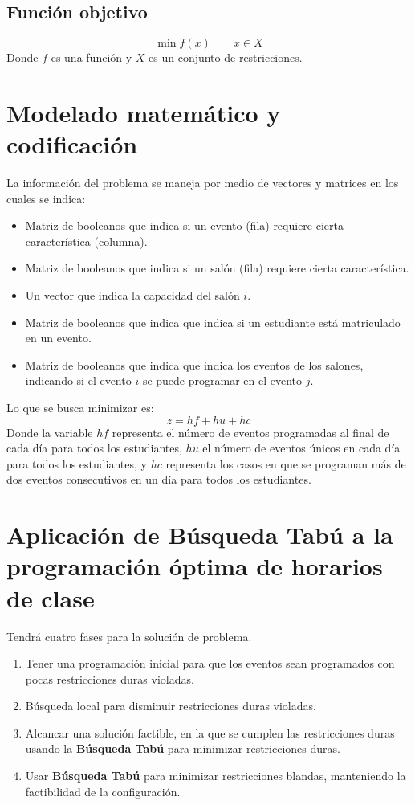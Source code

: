 \documentclass[12pt,letterpaper]{article}
\begin{document}
\subsection{Función objetivo}
\[
    \min f(x) \qquad x \in X
\]
Donde $f$ es una función y $X$ es un conjunto de restricciones.

\section{Modelado matemático y codificación}
La información del problema se maneja por medio de vectores y matrices en los cuales se indica:
\begin{itemize}
    \item Matriz de booleanos que indica si un evento (fila) requiere cierta característica (columna).
    \item Matriz de booleanos que indica si un salón (fila) requiere cierta característica.
    \item Un vector que indica la capacidad del salón $i$.
    \item Matriz de booleanos que indica que indica si un estudiante está matriculado en un evento.
    \item Matriz de booleanos que indica que indica los eventos de los salones, indicando si el evento
    $i$ se puede programar en el evento $j$.
\end{itemize}

Lo que se busca minimizar es:
$$z = hf + hu + hc$$
Donde la variable $hf$ representa el número de eventos programadas al final de cada día para todos
los estudiantes, $hu$ el número de eventos únicos en cada día para todos los estudiantes, y
$hc$ representa los casos en que se programan más de dos eventos consecutivos en un día para todos los estudiantes.

\section{Aplicación de Búsqueda Tabú a la programación óptima de horarios de clase}
Tendrá cuatro fases para la solución de problema.
\begin{enumerate}
    \item Tener una programación inicial para que los eventos sean programados con pocas restricciones
    duras violadas.
    \item Búsqueda local para disminuir restricciones duras violadas.
    \item Alcancar una solución factible, en la que se cumplen las restricciones duras usando
    la \textbf{Búsqueda Tabú} para minimizar restricciones duras.
    \item Usar \textbf{Búsqueda Tabú} para minimizar restricciones blandas, manteniendo la
    factibilidad de la configuración.
\end{enumerate}
\end{document}
